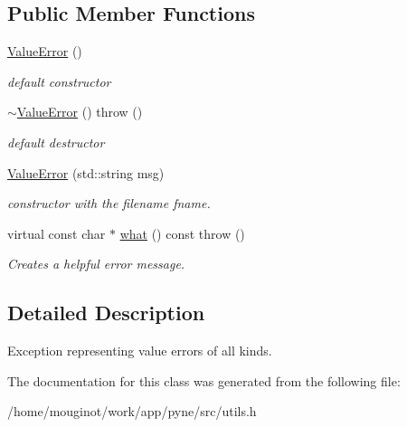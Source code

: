 \subsection*{Public Member Functions}
\begin{DoxyCompactItemize}
\item 
\mbox{\label{classpyne_1_1_value_error_a99845e7601cc6e6db6a3ef6d904795e2}} 
\hyperlink{classpyne_1_1_value_error_a99845e7601cc6e6db6a3ef6d904795e2}{Value\+Error} ()
\begin{DoxyCompactList}\small\item\em default constructor \end{DoxyCompactList}\item 
\mbox{\label{classpyne_1_1_value_error_a9925f29080ee4da11b17522550579aa8}} 
\hyperlink{classpyne_1_1_value_error_a9925f29080ee4da11b17522550579aa8}{$\sim$\+Value\+Error} ()  throw ()
\begin{DoxyCompactList}\small\item\em default destructor \end{DoxyCompactList}\item 
\mbox{\label{classpyne_1_1_value_error_a628862d2a78b9491d46f7c4814dfed9f}} 
\hyperlink{classpyne_1_1_value_error_a628862d2a78b9491d46f7c4814dfed9f}{Value\+Error} (std\+::string msg)
\begin{DoxyCompactList}\small\item\em constructor with the filename {\itshape fname}. \end{DoxyCompactList}\item 
\mbox{\label{classpyne_1_1_value_error_a34517c66d43b9aaebbe181c6a4156103}} 
virtual const char $\ast$ \hyperlink{classpyne_1_1_value_error_a34517c66d43b9aaebbe181c6a4156103}{what} () const  throw ()
\begin{DoxyCompactList}\small\item\em Creates a helpful error message. \end{DoxyCompactList}\end{DoxyCompactItemize}


\subsection{Detailed Description}
Exception representing value errors of all kinds. 

The documentation for this class was generated from the following file\+:\begin{DoxyCompactItemize}
\item 
/home/mouginot/work/app/pyne/src/utils.\+h\end{DoxyCompactItemize}
